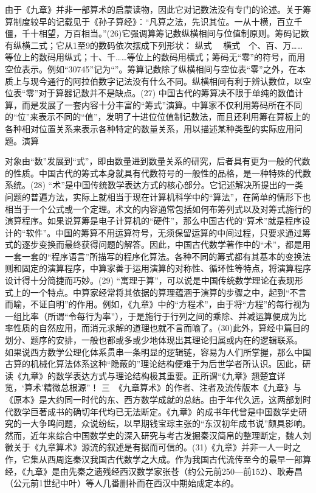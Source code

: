 \documentclass[a4paper,12pt,UTF8,twoside]{ctexbook}
\begin{document}
由于《九章》并非一部算术的启蒙读物，因此它对记数法没有专门的论述。关于筹算制度较早的记载见于《孙子算经》：“凡算之法，先识其位。一从十横，百立千僵，千十相望，万百相当。”(26)它强调算筹记数纵横相间与位值制原则。筹码记数有纵横二式；它从1至9的数码依次摆成下列形状：
纵式　
横式　个、百、万……等位上的数码用纵式；十、千……等位上的数码用横式；筹码无“零”的符号，而用空位表示。例如“30745”记为“”。筹算记数除了纵横相间与空位表“零”之外，在本质上与现今通行的阿拉伯数字记法没有什么不同。纵横相间有利于辨认数位，以空位表“零”对于算器记数并不是缺点。(27)
中国古代的筹算决不限于单纯的数值计算，而是发展了一套内容十分丰富的“筹式”演算。中算家不仅利用筹码所在不同的“位”来表示不同的“值”，发明了十进位位值制记数法，而且还利用筹在算板上的各种相对位置关系来表示各种特定的数量关系，用以描述某种类型的实际应用问题。演算

对象由“数”发展到“式”，即由数量进到数量关系的研究，后者具有更为一般的代数的性质。中国古代的筹式本身就具有代数符号的一般性的品格，是一种特殊的代数系统。(28)
“术”是中国传统数学表达方式的核心部分。它记述解决所提出的一类问题的普遍方法，实际上就相当于现在计算机科学中的“算法”，在简单的情形下也相当于一个公式或一个定理。术文的内容通常包括如何布筹列式以及对筹式施行的演算程序。如果说算筹是电子计算机的“硬件”，那么中国古代的“算术”就是程序设计的“软件”。中国的筹算不用运算符号，无须保留运算的中间过程，只要求通过筹式的逐步变换而最终获得问题的解答。因此，中国古代数学著作中的“术”，都是用一套一套的“程序语言”所描写的程序化算法。各种不同的筹式都有其基本的变换法则和固定的演算程序，中算家善于运用演算的对称性、循环性等特点，将演算程序设计得十分简捷而巧妙。(29)
“寓理于算”，可以说是中国传统数学理论在表现形式上的一个特点。中算家经常将其依据的算理蕴涵于演算的步骤之中，起到“不言而喻，不证自明”的作用。例如，《九章》中的“方程术”，由于将“方程”的每行视为一组比率（所谓“令每行为率”），于是施行于行列之间的乘除、并减运算便成为比率性质的自然应用，而消元求解的道理也就不言而喻了。(30)此外，算经中篇目的划分、题序的安排，一般也都或多或少地体现出其理论归属或内在的逻辑联系。
如果说西方数学公理化体系贯串一条明显的逻辑链，容易为人们所掌握，那么中国古算的机械化算法体系这种“隐蔽的”理论结构便难于为后世学者所认识。因此，研读《九章》的数学表达方式与理论结构极其重要。正所谓“《九章》翘楚宜详览，‘算术’精微总根源”！
三　《九章算术》的作者、注者及流传版本《九章》与《原本》是大约同一时代的东、西方数学成就的总结。由于年代久远，这两部划时代数学巨著成书的确切年代均已无法断定。《九章》的成书年代曾是中国数学史研究的一大争鸣问题，众说纷纭，以早期钱宝琮主张的“东汉初年成书说”颇具影响。然而，近年来综合中国数学史的深入研究与考古发掘秦汉简帛的整理断定，魏人刘徽关于《九章算术》源流的叙述是有据而可信的。(31)《九章》并非一人一时之作，它集从西周迄秦汉我国古代数学之大成。作为我国古代流传至今的最早一部算经，《九章》是由先秦之遗残经西汉数学家张苍（约公元前250—前152）、耿寿昌（公元前1世纪中叶）等人几番删补而在西汉中期始成定本的。
\end{document}

